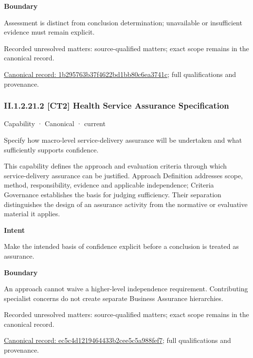\textbf{Boundary}



Assessment is distinct from conclusion determination; unavailable or insufficient evidence must remain explicit.


{\small Recorded unresolved matters: source-qualified matters; exact scope remains in the canonical record.}\par
{\footnotesize \href{../../../../continuum/strategy/capability/1b295763b37f4622bd1bb80c6ea3741c.md}{Canonical record: 1b295763b37f4622bd1bb80c6ea3741c}; full qualifications and provenance.}\par
\subsubsection*{II.1.2.21.2 [CT2] Health Service Assurance Specification}
\label{navigation:II.1.2.21.2}

\label{element:ec5c4d1219464433b2cee5c5a988fef7}
{\small Capability · Canonical · current}\par

Specify how macro-level service-delivery assurance will be undertaken and what sufficiently supports confidence.



This capability defines the approach and evaluation criteria through which service-delivery assurance can be justified. Approach Definition addresses scope, method, responsibility, evidence and applicable independence; Criteria Governance establishes the basis for judging sufficiency. Their separation distinguishes the design of an assurance activity from the normative or evaluative material it applies.



\textbf{Intent}



Make the intended basis of confidence explicit before a conclusion is treated as assurance.



\textbf{Boundary}



An approach cannot waive a higher-level independence requirement. Contributing specialist concerns do not create separate Business Assurance hierarchies.


{\small Recorded unresolved matters: source-qualified matters; exact scope remains in the canonical record.}\par
{\footnotesize \href{../../../../continuum/strategy/capability/ec5c4d1219464433b2cee5c5a988fef7.md}{Canonical record: ec5c4d1219464433b2cee5c5a988fef7}; full qualifications and provenance.}\par
